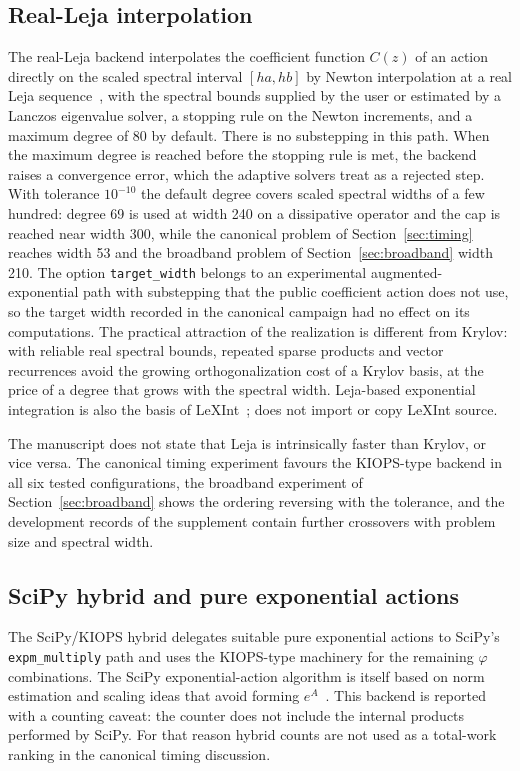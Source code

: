 \subsection{Real-Leja interpolation}

The real-Leja backend interpolates the coefficient function $C(z)$ of an action
directly on the scaled spectral interval $[ha,hb]$ by Newton interpolation at a
real Leja sequence~\cite{CaliariVianelloBergamaschi2004}, with the spectral
bounds supplied by the user or estimated by a Lanczos eigenvalue solver, a
stopping rule on the Newton increments, and a maximum degree of 80 by default.
There is no substepping in this path.  When the maximum degree is reached
before the stopping rule is met, the backend raises a convergence error, which
the adaptive solvers treat as a rejected step.  With tolerance $10^{-10}$ the
default degree covers scaled spectral widths of a few hundred: degree 69 is
used at width 240 on a dissipative operator and the cap is reached near width
300, while the canonical problem of Section~\ref{sec:timing} reaches width 53
and the broadband problem of Section~\ref{sec:broadband} width 210.  The
option \texttt{target\_width} belongs to an experimental augmented-exponential
path with substepping that the public coefficient action does not use, so the
target width recorded in the canonical campaign had no effect on its
computations.  The practical attraction of the realization is different from
Krylov: with reliable real spectral bounds, repeated sparse products and vector
recurrences avoid the growing orthogonalization cost of a Krylov basis, at the
price of a degree that grows with the spectral width.  Leja-based exponential
integration is also the basis of LeXInt~\cite{DekaEinkemmerTokman2023}; \pkg{}
does not import or copy LeXInt source.

The manuscript does not state that Leja is intrinsically faster than Krylov,
or vice versa.  The canonical timing experiment favours the KIOPS-type backend
in all six tested configurations, the broadband experiment of
Section~\ref{sec:broadband} shows the ordering reversing with the tolerance,
and the development records of the supplement contain further crossovers with
problem size and spectral width.

\subsection{SciPy hybrid and pure exponential actions}

The SciPy/KIOPS hybrid delegates suitable pure exponential actions to SciPy's
\texttt{expm\_multiply} path and uses the KIOPS-type machinery for the remaining
$\varphi$ combinations.  The SciPy exponential-action algorithm is itself based
on norm estimation and scaling ideas that avoid forming
$e^A$~\cite{AlMohyHigham2011}.  This backend is reported with a counting
caveat: the \pkg{} counter does not include the internal products performed by
SciPy.  For that reason hybrid counts are not used as a total-work ranking in
the canonical timing discussion.

